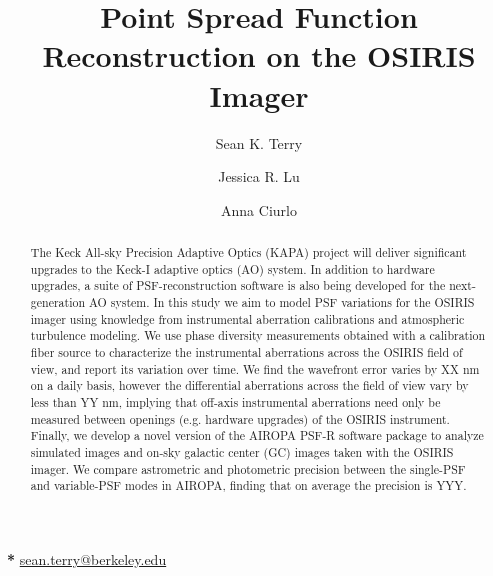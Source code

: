 \documentclass[]{spie}  %
\title{Point Spread Function Reconstruction on the OSIRIS Imager}
\author[a,*]{Sean K. Terry}
\author[a]{Jessica R. Lu}
\author[b]{Anna Ciurlo}
\affil[a]{Department of Astronomy, University of California, Berkeley, CA 94720, USA}
\affil[b]{Division of Astronomy \& Astrophysics, University of California Los Angeles, CA 90095, USA}
\begin{document}
\pagecolor{white}
\maketitle

\begin{abstract}
The Keck All-sky Precision Adaptive Optics (KAPA) project will deliver significant upgrades to the Keck-I adaptive optics (AO) system. In addition to hardware upgrades, a suite of PSF-reconstruction software is also being developed for the next-generation AO system. In this study we aim to model PSF variations for the OSIRIS imager using knowledge from instrumental aberration calibrations and atmospheric turbulence modeling. We use phase diversity measurements obtained with a calibration fiber source to characterize the instrumental aberrations across the OSIRIS field of view, and report its variation over time. We find the wavefront error varies by XX nm on a daily basis, however the differential aberrations across the field of view vary by less than YY nm, implying that off-axis instrumental aberrations need only be measured between openings (e.g. hardware upgrades) of the OSIRIS instrument. Finally, we develop a novel version of the AIROPA PSF-R software package to analyze simulated images and on-sky galactic center (GC) images taken with the OSIRIS imager. We compare astrometric and photometric precision between the single-PSF and variable-PSF modes in AIROPA, finding that on average the precision is YYY.
\end{abstract}


{\noindent\footnotesize\textbf{*} \href{mailto:sean.terry@berkeley.edu}{sean.terry@berkeley.edu}}
\end{document}

